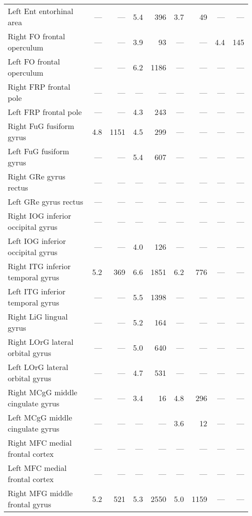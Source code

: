 \documentclass[]{article}
\begin{document}
\begin{table}[ht]
{\begin{tabular}{lrrrrrrrr}
  Left Ent   entorhinal area & --- & --- & 5.4 & 396 & 3.7 & 49 & --- & --- \\ 
  Right FO    frontal operculum & --- & --- & 3.9 & 93 & --- & --- & 4.4 & 145 \\ 
  Left FO    frontal operculum & --- & --- & 6.2 & 1186 & --- & --- & --- & --- \\ 
  Right FRP   frontal pole & --- & --- & --- & --- & --- & --- & --- & --- \\ 
  Left FRP   frontal pole & --- & --- & 4.3 & 243 & --- & --- & --- & --- \\ 
  Right FuG   fusiform gyrus & 4.8 & 1151 & 4.5 & 299 & --- & --- & --- & --- \\ 
  Left FuG   fusiform gyrus & --- & --- & 5.4 & 607 & --- & --- & --- & --- \\ 
  Right GRe   gyrus rectus & --- & --- & --- & --- & --- & --- & --- & --- \\ 
  Left GRe   gyrus rectus & --- & --- & --- & --- & --- & --- & --- & --- \\ 
  Right IOG   inferior occipital gyrus & --- & --- & --- & --- & --- & --- & --- & --- \\ 
  Left IOG   inferior occipital gyrus & --- & --- & 4.0 & 126 & --- & --- & --- & --- \\ 
  Right ITG   inferior temporal gyrus & 5.2 & 369 & 6.6 & 1851 & 6.2 & 776 & --- & --- \\ 
  Left ITG   inferior temporal gyrus & --- & --- & 5.5 & 1398 & --- & --- & --- & --- \\ 
  Right LiG   lingual gyrus & --- & --- & 5.2 & 164 & --- & --- & --- & --- \\ 
  Right LOrG  lateral orbital gyrus & --- & --- & 5.0 & 640 & --- & --- & --- & --- \\ 
  Left LOrG  lateral orbital gyrus & --- & --- & 4.7 & 531 & --- & --- & --- & --- \\ 
  Right MCgG  middle cingulate gyrus & --- & --- & 3.4 & 16 & 4.8 & 296 & --- & --- \\ 
  Left MCgG  middle cingulate gyrus & --- & --- & --- & --- & 3.6 & 12 & --- & --- \\ 
  Right MFC   medial frontal cortex & --- & --- & --- & --- & --- & --- & --- & --- \\ 
  Left MFC   medial frontal cortex & --- & --- & --- & --- & --- & --- & --- & --- \\ 
  Right MFG   middle frontal gyrus & 5.2 & 521 & 5.3 & 2550 & 5.0 & 1159 & --- & --- \\ 

\end{tabular}}
\end{table}
\end{document}
